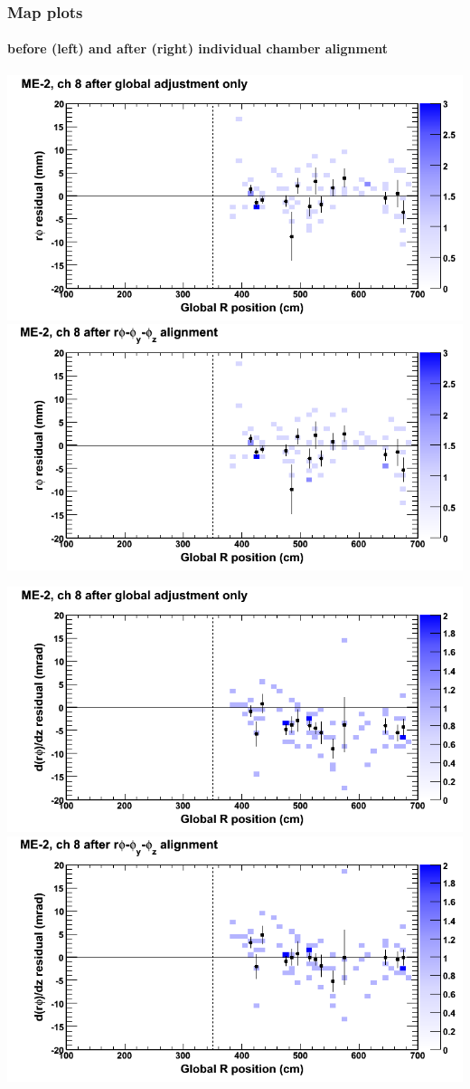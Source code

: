 \documentclass[compress]{beamer}
\begin{document}
\begin{frame}
\frametitle{Map plots}
\framesubtitle{before (left) and after (right) individual chamber alignment}
\includegraphics[width=0.5\linewidth]{ringmapplots_3dof/before_CSCvsr_mem2ch08_x.png} \includegraphics[width=0.5\linewidth]{ringmapplots_3dof/after_CSCvsr_mem2ch08_x.png}

\includegraphics[width=0.5\linewidth]{ringmapplots_3dof/before_CSCvsr_mem2ch08_dxdz.png} \includegraphics[width=0.5\linewidth]{ringmapplots_3dof/after_CSCvsr_mem2ch08_dxdz.png}
\end{frame}
\end{document}
